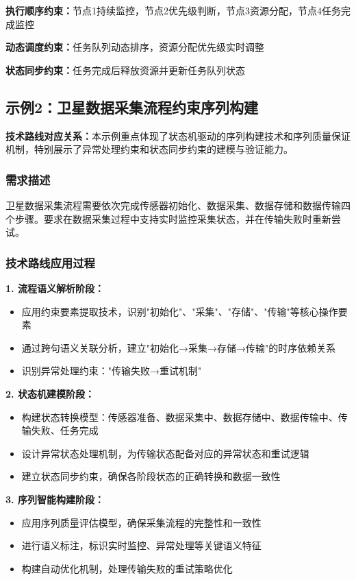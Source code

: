 \documentclass[fontset=windows]{article}
\begin{document}
\textbf{执行顺序约束：}节点1持续监控，节点2优先级判断，节点3资源分配，节点4任务完成监控

\textbf{动态调度约束：}任务队列动态排序，资源分配优先级实时调整

\textbf{状态同步约束：}任务完成后释放资源并更新任务队列状态

\subsection{示例2：卫星数据采集流程约束序列构建}

\textbf{技术路线对应关系：}本示例重点体现了状态机驱动的序列构建技术和序列质量保证机制，特别展示了异常处理约束和状态同步约束的建模与验证能力。

\subsubsection{需求描述}
卫星数据采集流程需要依次完成传感器初始化、数据采集、数据存储和数据传输四个步骤。要求在数据采集过程中支持实时监控采集状态，并在传输失败时重新尝试。

\subsubsection{技术路线应用过程}
\textbf{1. 流程语义解析阶段：}
\begin{itemize}
    \item 应用约束要素提取技术，识别"初始化"、"采集"、"存储"、"传输"等核心操作要素
    \item 通过跨句语义关联分析，建立"初始化→采集→存储→传输"的时序依赖关系
    \item 识别异常处理约束："传输失败→重试机制"
\end{itemize}

\textbf{2. 状态机建模阶段：}
\begin{itemize}
    \item 构建状态转换模型：传感器准备、数据采集中、数据存储中、数据传输中、传输失败、任务完成
    \item 设计异常状态处理机制，为传输状态配备对应的异常状态和重试逻辑
    \item 建立状态同步约束，确保各阶段状态的正确转换和数据一致性
\end{itemize}

\textbf{3. 序列智能构建阶段：}
\begin{itemize}
    \item 应用序列质量评估模型，确保采集流程的完整性和一致性
    \item 进行语义标注，标识实时监控、异常处理等关键语义特征
    \item 构建自动优化机制，处理传输失败的重试策略优化
\end{itemize}
\end{document}
